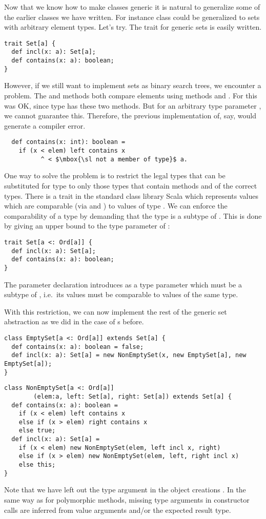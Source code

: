 Now that we know how to make classes generic it is natural to
generalize some of the earlier classes we have written. For instance
class  could be generalized to sets with arbitrary
element types. Let's try. The trait for generic sets is easily
written.
\begin{lstlisting}
trait Set[a] { 
  def incl(x: a): Set[a]; 
  def contains(x: a): boolean; 
}
\end{lstlisting}
However, if we still want to implement sets as binary search trees, we
encounter a problem. The  and  methods both
compare elements using methods \code{<} and \code{>}. For
 this was OK, since type  has these two
methods. But for an arbitrary type parameter , we cannot
guarantee this. Therefore, the previous implementation of, say,
 would generate a compiler error.
\begin{lstlisting}
  def contains(x: int): boolean = 
    if (x < elem) left contains x
          ^ < $\mbox{\sl not a member of type}$ a.
\end{lstlisting}
One way to solve the problem is to restrict the legal types that can
be substituted for type  to only those types that contain methods
\code{<} and \code{>} of the correct types. There is a trait
 in the standard class library Scala which represents
values which are comparable (via \code{<} and \code{>}) to values of
type . We can enforce the comparability of a type by demanding
that the type is a subtype of . This is done by giving an
upper bound to the type parameter of :
\begin{lstlisting}
trait Set[a <: Ord[a]] { 
  def incl(x: a): Set[a]; 
  def contains(x: a): boolean; 
}
\end{lstlisting}
The parameter declaration  introduces  as a
type parameter which must be a subtype of , i.e.\ its values
must be comparable to values of the same type.

With this restriction, we can now implement the rest of the generic
set abstraction as we did in the case of s before.

\begin{lstlisting}
class EmptySet[a <: Ord[a]] extends Set[a] {
  def contains(x: a): boolean = false;
  def incl(x: a): Set[a] = new NonEmptySet(x, new EmptySet[a], new EmptySet[a]);
}
\end{lstlisting}

\begin{lstlisting}
class NonEmptySet[a <: Ord[a]]
        (elem:a, left: Set[a], right: Set[a]) extends Set[a] {
  def contains(x: a): boolean = 
    if (x < elem) left contains x
    else if (x > elem) right contains x
    else true;
  def incl(x: a): Set[a] = 
    if (x < elem) new NonEmptySet(elem, left incl x, right)
    else if (x > elem) new NonEmptySet(elem, left, right incl x)
    else this;
}
\end{lstlisting}
Note that we have left out the type argument in the object creations
. In the same way as for polymorphic methods,
missing type arguments in constructor calls are inferred from value
arguments and/or the expected result type.

